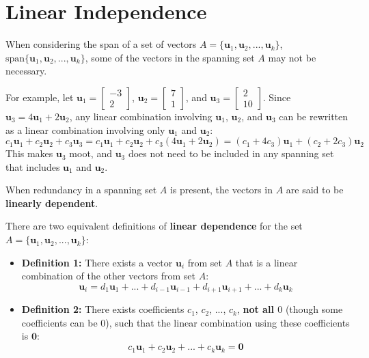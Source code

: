 \documentclass{article}
\begin{document}
\section*{Linear Independence}

When considering the span of a set of vectors \(A = \{\mathbf{u}_1, \mathbf{u}_2, ..., \mathbf{u}_k\}\), \(\text{span}\{\mathbf{u}_1, \mathbf{u}_2, ..., \mathbf{u}_k\}\), some of the vectors in the spanning set \(A\) may not be necessary. 

For example, let \(\mathbf{u}_1 = \begin{bmatrix} -3 \\ 2 \end{bmatrix}\), \(\mathbf{u}_2 = \begin{bmatrix} 7 \\ 1 \end{bmatrix}\), and \(\mathbf{u}_3 = \begin{bmatrix} 2 \\ 10 \end{bmatrix}\). Since \(\mathbf{u}_3 = 4\mathbf{u}_1 + 2\mathbf{u}_2\), any linear combination involving \(\mathbf{u}_1\), \(\mathbf{u}_2\), and \(\mathbf{u}_3\) can be rewritten as a linear combination involving only \(\mathbf{u}_1\) and \(\mathbf{u}_2\): 
\[c_1\mathbf{u}_1 + c_2\mathbf{u}_2 + c_3\mathbf{u}_3 = c_1\mathbf{u}_1 + c_2\mathbf{u}_2 + c_3(4\mathbf{u}_1 + 2\mathbf{u}_2) = (c_1 + 4c_3)\mathbf{u}_1 + (c_2 + 2c_3)\mathbf{u}_2\]
This makes \(\mathbf{u}_3\) moot, and \(\mathbf{u}_3\) does not need to be included in any spanning set that includes \(\mathbf{u}_1\) and \(\mathbf{u}_2\).

When redundancy in a spanning set \(A\) is present, the vectors in \(A\) are said to be {\bf linearly dependent}. 

There are two equivalent definitions of {\bf linear dependence} for the set \(A = \{\mathbf{u}_1, \mathbf{u}_2, ..., \mathbf{u}_k\}\):

\begin{itemize}
\item {\bf Definition 1:} There exists a vector \(\mathbf{u}_i\) from set \(A\) that is a linear combination of the other vectors from set \(A\):
\[\mathbf{u}_i = d_1\mathbf{u}_1 + ... + d_{i-1}\mathbf{u}_{i-1} + d_{i+1}\mathbf{u}_{i+1} + ... + d_k\mathbf{u}_k\] 
\item {\bf Definition 2:} There exists coefficients \(c_1\), \(c_2\), ..., \(c_k\), {\bf not all \(0\)} (though some coefficients can be \(0\)), such that the linear combination using these coefficients is \(\mathbf{0}\):
\[c_1 \mathbf{u}_1 + c_2 \mathbf{u}_2 + ... + c_k \mathbf{u}_k = \mathbf{0}\] 
\end{itemize}
\end{document}
